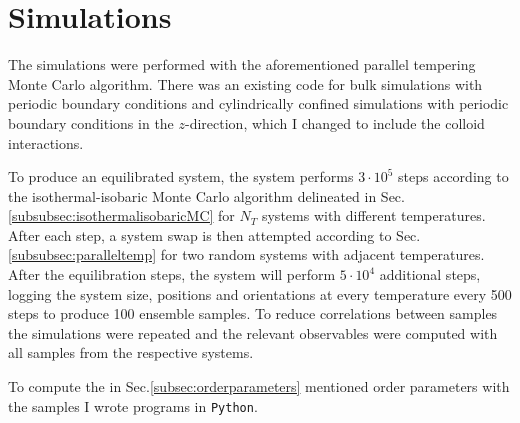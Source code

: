 \section{Simulations}

The simulations were performed with the aforementioned parallel tempering Monte Carlo algorithm.
There was an existing code for bulk simulations with periodic boundary conditions and cylindrically confined simulations with periodic boundary conditions in the $z$-direction, which I changed to include the colloid interactions. 

To produce an equilibrated system, the system performs $3\cdot10^5$ steps according to the isothermal-isobaric Monte Carlo algorithm delineated in Sec. \ref{subsubsec:isothermalisobaricMC} for $N_T$ systems with different temperatures. 
After each step, a system swap is then attempted according to Sec.\ref{subsubsec:paralleltemp} for two random systems with adjacent temperatures. After the equilibration steps, the system will perform $5\cdot10^4$ additional steps, logging the system size, positions and orientations at every temperature every 500 steps to produce 100 ensemble samples. To reduce correlations between samples the simulations were repeated and the relevant observables were computed with all samples from the respective systems. 

To compute the in Sec.\ref{subsec:orderparameters} mentioned order parameters with the samples I wrote programs in \texttt{Python}.

